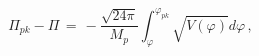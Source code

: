 \begin{equation}\label{generalp}
\Pi_{pk}-\Pi \, = \,
-\frac{\sqrt{24\pi}}{M_{p}}\int_{\varphi}^{\varphi_{pk}}\sqrt{V(\varphi)}d\varphi \, ,
\end{equation}

